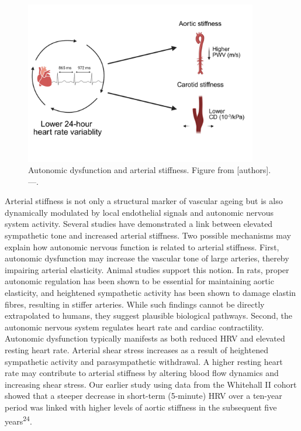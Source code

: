 \documentclass[
  a4paper,
  headsepline=true,
  open=any]{scrbook}
\begin{document}
\begin{figure}

{\centering \includegraphics[width=4in,height=\textheight]{images/hrv_arterial_stiffness.pdf}

}

\caption{Autonomic dysfunction and arterial stiffness. Figure from
{[}authors{]}. ---.}

\end{figure}

Arterial stiffness is not only a structural marker of vascular ageing
but is also dynamically modulated by local endothelial signals and
autonomic nervous system activity. Several studies have demonstrated a
link between elevated sympathetic tone and increased arterial stiffness.
Two possible mechanisms may explain how autonomic nervous function is
related to arterial stiffness. First, autonomic dysfunction may increase
the vascular tone of large arteries, thereby impairing arterial
elasticity. Animal studies support this notion. In rats, proper
autonomic regulation has been shown to be essential for maintaining
aortic elasticity, and heightened sympathetic activity has been shown to
damage elastin fibres, resulting in stiffer arteries. While such
findings cannot be directly extrapolated to humans, they suggest
plausible biological pathways. Second, the autonomic nervous system
regulates heart rate and cardiac contractility. Autonomic dysfunction
typically manifests as both reduced HRV and elevated resting heart rate.
Arterial shear stress increases as a result of heightened sympathetic
activity and parasympathetic withdrawal. A higher resting heart rate may
contribute to arterial stiffness by altering blood flow dynamics and
increasing shear stress. Our earlier study using data from the Whitehall
II cohort showed that a steeper decrease in short-term (5-minute) HRV
over a ten-year period was linked with higher levels of aortic stiffness
in the subsequent five years\textsuperscript{24}.
\end{document}
